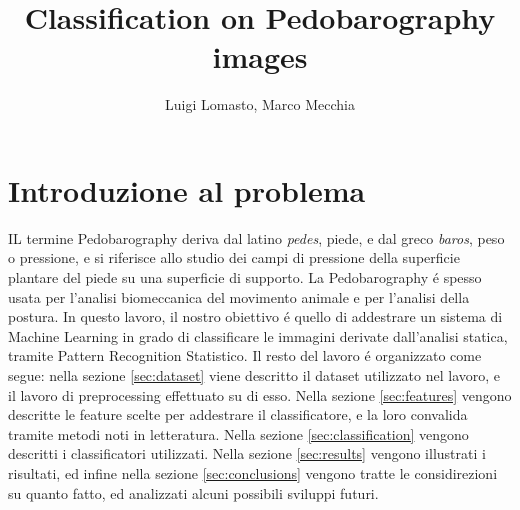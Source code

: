 \documentclass[11pt,a4paper]{article}
\begin{document}
\title{Classification on Pedobarography images}
\author{Luigi Lomasto, Marco Mecchia} 
\maketitle
\section{Introduzione al problema}
IL termine Pedobarography deriva dal latino \emph{pedes}, piede, e dal greco \emph{baros}, peso o pressione, e si riferisce allo studio dei campi di pressione della superficie plantare del piede su una superficie di supporto. La Pedobarography \'e spesso usata per l'analisi biomeccanica del movimento animale e per l'analisi della postura. In questo lavoro, il nostro obiettivo \'e quello di addestrare un sistema di Machine Learning in grado di classificare le immagini derivate dall'analisi statica, tramite Pattern Recognition Statistico.
Il resto del lavoro \'e organizzato come segue: nella sezione \ref{sec:dataset} viene descritto il dataset utilizzato nel lavoro, e il lavoro di preprocessing effettuato su di esso. Nella sezione \ref{sec:features} vengono descritte le feature scelte per addestrare il classificatore, e la loro convalida tramite metodi noti in letteratura. Nella sezione \ref{sec:classification} vengono descritti i classificatori utilizzati. Nella sezione \ref{sec:results} vengono illustrati i risultati, ed infine nella sezione \ref{sec:conclusions} vengono tratte le considirezioni su quanto fatto, ed analizzati alcuni possibili sviluppi futuri.
\end{document}
